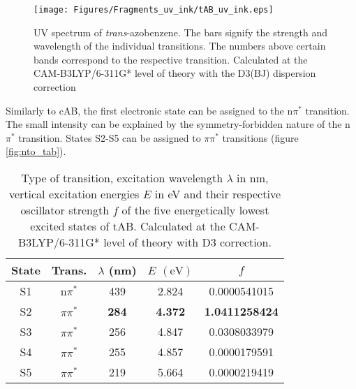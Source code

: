 \vspace{1 cm}
%
%
%
\begin{figure}[H]
    \centering
    \texttt{[image: Figures/Fragments\_uv\_ink/tAB\_uv\_ink.eps]}
    \caption{UV spectrum of \textit{trans}-azobenzene. The bars signify the strength and wavelength of the individual transitions. The numbers above certain bands correspond to the respective transition. Calculated at the CAM-B3LYP/6-311G* level of theory with the D3(BJ) dispersion correction}
    \label{fig:uv_fig_tAB}
\end{figure}
%
%
%
Similarly to cAB, the first electronic state can be assigned to the n$\pi^*$ transition. The small intensity can be explained by the symmetry-forbidden nature of the n$\pi^*$ transition. States S2-S5 can be assigned to $\pi\pi^*$ transitions (figure \ref{fig:nto_tab}).
%
%
%
\begin{table}[H]
\caption{Type of transition, excitation wavelength $\lambda$ in nm, vertical excitation energies $E$ in eV and their respective oscillator strength $f$ of the five energetically lowest excited states of tAB. Calculated at the CAM-B3LYP/6-311G* level of theory with D3 correction.}
\label{tab:excited_states_tAB}
\vspace{0.1 cm}
\centering
\begin{tabular}{ccccc}
\toprule
State & Trans. & $\lambda$ (nm)     & $E$ $\left(\si{\eV}\right)$          & $f$    \\
\midrule
S1    & n$\pi^*$	& 439             & 2.824                  & 0.0000541015          \\
S2    & $\pi\pi^*$ 	&\textbf{284}	  & \textbf{4.372}         & \textbf{1.0411258424} \\
S3    & $\pi\pi^*$	& 256             & 4.847                  & 0.0308033979          \\
S4    & $\pi\pi^*$	& 255             & 4.857                  & 0.0000179591          \\
S5    & $\pi\pi^*$	& 219             & 5.664                  & 0.0000219419         \\
\bottomrule
\end{tabular}
\end{table}
%
%
%
